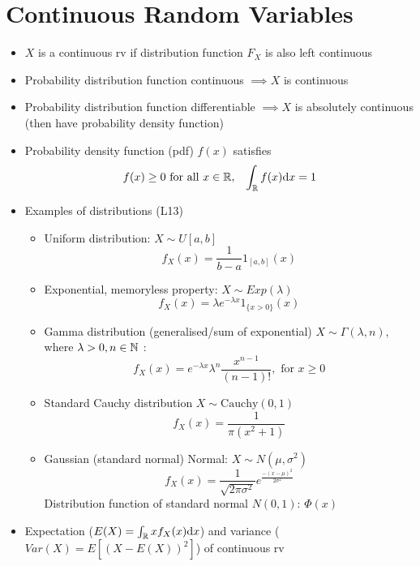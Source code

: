 \section{Continuous Random Variables}
\begin{itemize}
      \item $X$ is a continuous rv if distribution function $F_X$ is also left continuous
      \item Probability distribution function continuous $\implies X$ is continuous
      \item Probability distribution function differentiable $\implies X$ is absolutely continuous (then have probability density function)
      \item Probability density function (pdf) $f(x)$ satisfies
            \begin{align*}
                   & f(x) \geq 0 \text{ for all } x \in \mathbb{R}, & \int_{\mathbb{R}} f(x) \mathrm{d} x = 1
            \end{align*}
      \item Examples of distributions (L13)
            \begin{itemize}
                  \item Uniform distribution: $X \sim U[a,b]$ \[f_X(x) = \frac{1}{b-a} 1_{[a,b]}(x)\]
                  \item Exponential, memoryless property: $X \sim Exp(\lambda)$ \[f_X(x) = \lambda e^{-\lambda x} 1_{\{x>0\}}(x)\]
                  \item Gamma distribution (generalised/sum of exponential) $X \sim \Gamma(\lambda,n)$, where $\lambda >0, n\in \mathbb{N}$ : \[f_X(x) = e^{-\lambda x} \lambda^n \frac{x^{n-1}}{(n-1)!}, \text{ for } x\geqslant 0\]
                  \item Standard Cauchy distribution $X \sim \text{Cauchy}(0,1)$ \[f_X(x) = \frac{1}{\pi(x^2+1)}\]
                  \item Gaussian (standard normal) Normal: $X \sim N(\mu, \sigma^2)$ \[f_X(x) = \frac{1}{\sqrt{2\pi \sigma^2}} e^\frac{-(x-\mu)^2}{2\sigma^2}\] Distribution function of standard normal $N(0,1)$: $\Phi(x)$
            \end{itemize}
      \item Expectation ($E(X)= \int_{\mathbb{R}} x f_X(x) \mathrm{d} x$) and variance ($Var(X)=E[(X-E(X))^2]$) of continuous rv
\end{itemize}

